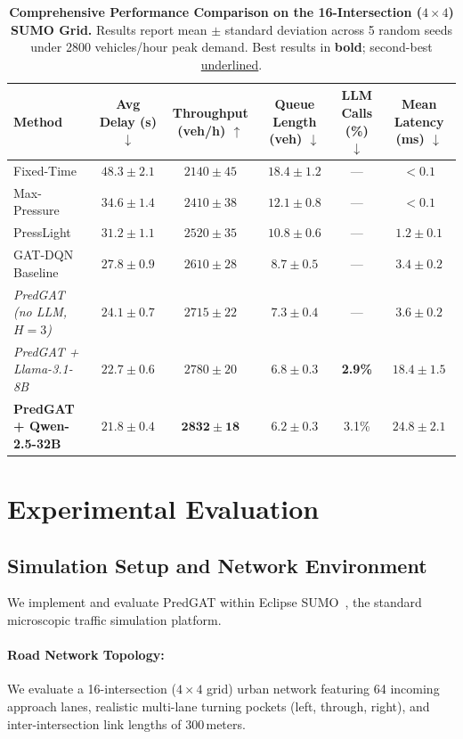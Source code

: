 \documentclass[11pt,a4paper]{article}
\begin{document}
\begin{table}[t]
\centering
\small
\caption{\textbf{Comprehensive Performance Comparison on the 16-Intersection ($4\times4$) SUMO Grid.} Results report mean $\pm$ standard deviation across 5 random seeds under 2800 vehicles/hour peak demand. Best results in \textbf{bold}; second-best \underline{underlined}.}
\label{tab:main_results}
\begin{tabular}{lccccc}
\toprule
\textbf{Method} & \textbf{Avg Delay (s)} $\downarrow$ & \textbf{Throughput (veh/h)} $\uparrow$ & \textbf{Queue Length (veh)} $\downarrow$ & \textbf{LLM Calls (\%)} $\downarrow$ & \textbf{Mean Latency (ms)} $\downarrow$ \\
\midrule
Fixed-Time & $48.3 \pm 2.1$ & $2140 \pm 45$ & $18.4 \pm 1.2$ & --- & $< 0.1$ \\
Max-Pressure~\cite{varaiya2013max} & $34.6 \pm 1.4$ & $2410 \pm 38$ & $12.1 \pm 0.8$ & --- & $< 0.1$ \\
PressLight~\cite{wei2019presslight} & $31.2 \pm 1.1$ & $2520 \pm 35$ & $10.8 \pm 0.6$ & --- & $1.2 \pm 0.1$ \\
GAT-DQN Baseline & $27.8 \pm 0.9$ & $2610 \pm 28$ & $8.7 \pm 0.5$ & --- & $3.4 \pm 0.2$ \\
\midrule
\textit{PredGAT (no LLM, $H=3$)} & $24.1 \pm 0.7$ & $2715 \pm 22$ & $7.3 \pm 0.4$ & --- & $3.6 \pm 0.2$ \\
\textit{PredGAT + Llama-3.1-8B} & \underline{$22.7 \pm 0.6$} & \underline{$2780 \pm 20$} & \underline{$6.8 \pm 0.3$} & \textbf{2.9\%} & $18.4 \pm 1.5$ \\
\textbf{PredGAT + Qwen-2.5-32B} & $\mathbf{21.8 \pm 0.4}$ & $\mathbf{2832 \pm 18}$ & $\mathbf{6.2 \pm 0.3}$ & 3.1\% & $24.8 \pm 2.1$ \\
\bottomrule
\end{tabular}
\end{table}

\section{Experimental Evaluation}
\label{sec:experiments}

\subsection{Simulation Setup and Network Environment}
We implement and evaluate PredGAT within Eclipse SUMO~\cite{lopez2018microscopic}, the standard microscopic traffic simulation platform.
\paragraph{Road Network Topology:} We evaluate a 16-intersection ($4\times4$ grid) urban network featuring 64 incoming approach lanes, realistic multi-lane turning pockets (left, through, right), and inter-intersection link lengths of $300$\,meters.
\end{document}
